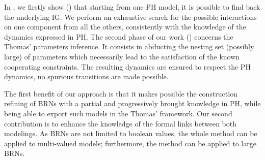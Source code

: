 In \cite{FPIMR12-CMSB}, we firstly show () that starting from one PH model, it is possible to find back the underlying IG.
We perform an exhaustive search for the possible interactions on one component from all the
others, consistently with the knowledge of the dynamics expressed in PH.
The second phase of our work () concerns the Thomas' parameters inference.
It consists in abducting the nesting set (possibly large) of parameters which necessarily
lead to the satisfaction of the known cooperating constraints.
The resulting dynamics are ensured to respect the PH dynamics, \ie no spurious transitions are
made possible.

The first benefit of our approach is that it makes possible the construction refining of BRNs with a partial and progressively brought knowledge in PH, while being able to export such models in the Thomas' framework.
Our second contribution is to enhance the knowledge of the formal links between both modelings.
As BRNs are not limited to boolean values, the whole method can be applied to multi-valued models;
furthermore, the method can be applied to large BRNs.

\begin{comment}
\paragraph{Outline.}
\pref{sec:frameworks} recalls the PH and Thomas frameworks;
\pref{sec:infer-IG} defines the IG inference from PH;
\pref{sec:infer-K} details the enumeration of Thomas parametrizations compatible with a PH;
\pref{sec:examples} gives some information about the implementation of the method.
\end{comment}
